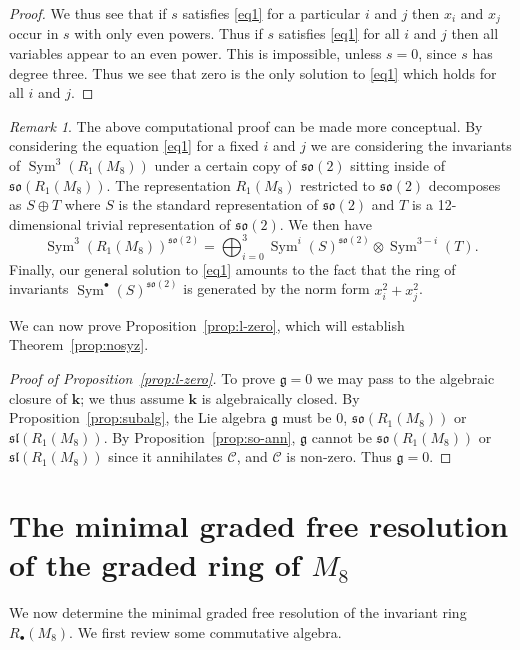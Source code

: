 \documentclass{amsart}
\theoremstyle{definition}
\theoremstyle{remark}
\newtheorem{remark}[theorem]{\it Remark}
\DeclareMathOperator{\Sym}{Sym}
\def\fieldk{\mathbf{k}}
\def\cubic{\mathcal{C}}
\let\mf\mathfrak
\begin{document}
\begin{proof}
We thus see that if $s$ satisfies \eqref{eq1} for a particular $i$ and $j$ then $x_i$ and $x_j$ occur in $s$ with only
even powers.  Thus if $s$ satisfies \eqref{eq1} for all $i$ and $j$ then all variables appear to an even power.  This
is impossible, unless $s=0$, since $s$ has degree three.  Thus we see that zero is the only solution to \eqref{eq1}
which holds for all $i$ and $j$.
\end{proof}

\begin{remark}
The above computational proof can be made more conceptual.  By considering the equation \eqref{eq1} for a fixed $i$ and
$j$ we are considering the invariants of $\Sym^3(R_1(M_8))$ under a certain copy of $\mf{so}(2)$ sitting inside of
$\mf{so}(R_1(M_8))$.  The representation $R_1(M_8)$ restricted to $\mf{so}(2)$ decomposes as $S \oplus T$ where $S$ is
the standard representation of $\mf{so}(2)$ and $T$ is a 12-dimensional trivial representation of $\mf{so}(2)$.  We
then have
\begin{displaymath}
\Sym^3(R_1(M_8))^{\mf{so}(2)}=\bigoplus_{i=0}^3 \Sym^i(S)^{\mf{so}(2)} \otimes \Sym^{3-i}(T).
\end{displaymath}
Finally, our general solution to \eqref{eq1} amounts to the fact that the ring of invariants
$\Sym^{\bullet}(S)^{\mf{so}(2)}$ is generated by the norm form $x_i^2+x_j^2$.
\end{remark}

We can now prove Proposition~\ref{prop:l-zero}, which will establish Theorem~\ref{prop:nosyz}.

\begin{proof}[Proof of Proposition~\ref{prop:l-zero}]
To prove $\mf{g}=0$ we may pass to the algebraic closure of $\fieldk$; we thus assume $\fieldk$ is algebraically closed.
By Proposition~\ref{prop:subalg}, the Lie algebra $\mf{g}$ must be 0, $\mf{so}(R_1(M_8))$ or $\mf{sl}(R_1(M_8))$.  By
Proposition~\ref{prop:so-ann}, $\mf{g}$ cannot be $\mf{so}(R_1(M_8))$ or $\mf{sl}(R_1(M_8))$ since it annihilates
$\cubic$, and $\cubic$ is non-zero.  Thus $\mf{g}=0$.
\end{proof}

\section{The minimal graded free resolution of the graded ring of $M_8$}
\label{s:freeresolution}

We now determine the minimal graded free resolution of the invariant ring $R_{\bullet}(M_8)$.  We first review some
commutative algebra.  
\end{document}
